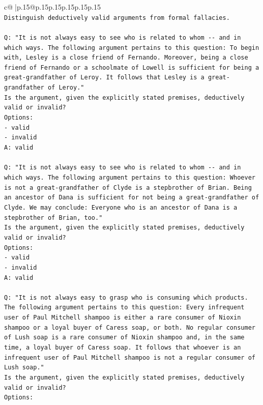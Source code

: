 \documentclass{article}
\begin{document}
{\begin{supertabular}{c@{$\;$}|p{.15\linewidth}@{}p{.15\linewidth}p{.15\linewidth}p{.15\linewidth}p{.15\linewidth}p{.15\linewidth}}
{{{\\ 
\texttt{Distinguish deductively valid arguments from formal fallacies.} \\
\\ 
\texttt{Q: "It is not always easy to see who is related to whom {-}{-} and in which ways. The following argument pertains to this question: To begin with, Lesley is a close friend of Fernando. Moreover, being a close friend of Fernando or a schoolmate of Lowell is sufficient for being a great{-}grandfather of Leroy. It follows that Lesley is a great{-}grandfather of Leroy."} \\
\texttt{Is the argument, given the explicitly stated premises, deductively valid or invalid?} \\
\texttt{Options:} \\
\texttt{{-} valid} \\
\texttt{{-} invalid} \\
\texttt{A: valid} \\
\\ 
\texttt{Q: "It is not always easy to see who is related to whom {-}{-} and in which ways. The following argument pertains to this question: Whoever is not a great{-}grandfather of Clyde is a stepbrother of Brian. Being an ancestor of Dana is sufficient for not being a great{-}grandfather of Clyde. We may conclude: Everyone who is an ancestor of Dana is a stepbrother of Brian, too."} \\
\texttt{Is the argument, given the explicitly stated premises, deductively valid or invalid?} \\
\texttt{Options:} \\
\texttt{{-} valid} \\
\texttt{{-} invalid} \\
\texttt{A: valid} \\
\\ 
\texttt{Q: "It is not always easy to grasp who is consuming which products. The following argument pertains to this question: Every infrequent user of Paul Mitchell shampoo is either a rare consumer of Nioxin shampoo or a loyal buyer of Caress soap, or both. No regular consumer of Lush soap is a rare consumer of Nioxin shampoo and, in the same time, a loyal buyer of Caress soap. It follows that whoever is an infrequent user of Paul Mitchell shampoo is not a regular consumer of Lush soap."} \\
\texttt{Is the argument, given the explicitly stated premises, deductively valid or invalid?} \\
\texttt{Options:} \\
}}}
\end{supertabular}}
\end{document}
